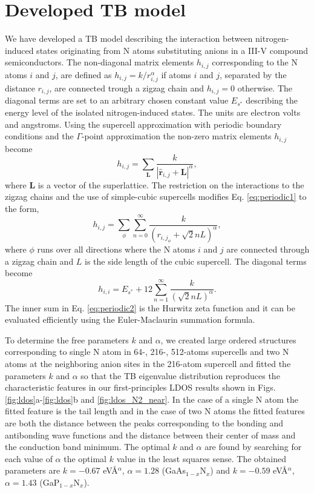 \documentclass[aps,prb,10pt,twocolumn,groupedaddress]{revtex4-1}
\begin{document}
\section{Developed TB model}
\label{appendix}
We have developed a TB model describing the interaction between
nitrogen-induced states originating from N atoms substituting anions 
in a III-V compound semiconductors. The non-diagonal matrix elements 
$h_{i,j}$ corresponding to the N atoms $i$ and $j$, are 
defined as $h_{i,j}=k/r_{i,j}^{\alpha}$ if atoms $i$ and $j$, separated by the 
distance $r_{i,j}$, are connected trough a zigzag chain and $h_{i,j}=0$ otherwise.
The diagonal terms are set to an arbitrary chosen 
constant value $E_{s^*}$ describing the energy level of the isolated 
nitrogen-induced 
states. The units are electron volts and angstroms. Using the supercell 
approximation with periodic boundary conditions and the $\Gamma$-point 
approximation the non-zero matrix elements $h_{i,j}$ become
\begin{equation}
  h_{i,j}=\sum_{\mathbf{L}}\frac{k}{\left|\mathbf{\hat{r}}_{i,j}+\mathbf{L}\right|^{\alpha}},
\label{eq:periodic1}
\end{equation}
where $\mathbf{L}$ is a vector of the superlattice. The restriction on the 
interactions to the zigzag chains  and the use of simple-cubic supercells
modifies Eq. \ref{eq:periodic1} to the form,
\begin{equation}
  h_{i,j}=\sum_{\phi}\sum_{n=0}^{\infty}\frac{k}{\left(r_{i,j_{\phi}}+\sqrt{2}nL\right)^{\alpha}},
\label{eq:periodic2}
\end{equation}
where $\phi$ runs over all directions where the N atoms $i$ and $j$ are 
connected through a zigzag chain and $L$ is the side length of the cubic 
supercell. The diagonal 
terms become
\begin{equation}
  h_{i,i}=E_{s^*}+12\sum_{n=1}^{\infty}\frac{k}{\left(\sqrt{2}nL\right)^{\alpha}}.
\label{eq:diagonal}
\end{equation}
The inner sum in Eq.
\ref{eq:periodic2} is the Hurwitz zeta function and it can be evaluated
efficiently using the Euler-Maclaurin summation formula\cite{press}. 

To determine
the free parameters $k$ and $\alpha$, we created large ordered structures
corresponding to single N atom in 64-, 216-, 512-atoms supercells and two N 
atoms at the neighboring anion sites in the 216-atom supercell and fitted the 
parameters $k$ and $\alpha$ so that the TB eigenvalue distribution reproduces 
the characteristic features in our first-principles LDOS results shown in Figs.
\ref{fig:ldos}a-\ref{fig:ldos}b and \ref{fig:ldos_N2_near}. 
In the case of a single N atom the
fitted feature is the tail length and in the case of two N atoms the fitted
features are both the distance between the peaks corresponding to the bonding
and antibonding wave functions and the distance between their center of mass
and the conduction band minimum.
The optimal $k$ and $\alpha$ are found by searching for each value of 
$\alpha$ the optimal $k$ value  in the least squares sense.
The obtained parameters are $k=-0.67$ eV\r{A}$^\alpha$, $\alpha=1.28$ 
(GaAs$_{1-x}$N$_x$) and $k=-0.59$ eV\r{A}$^\alpha$, $\alpha=1.43$ 
(GaP$_{1-x}$N$_x$).
\end{document}
